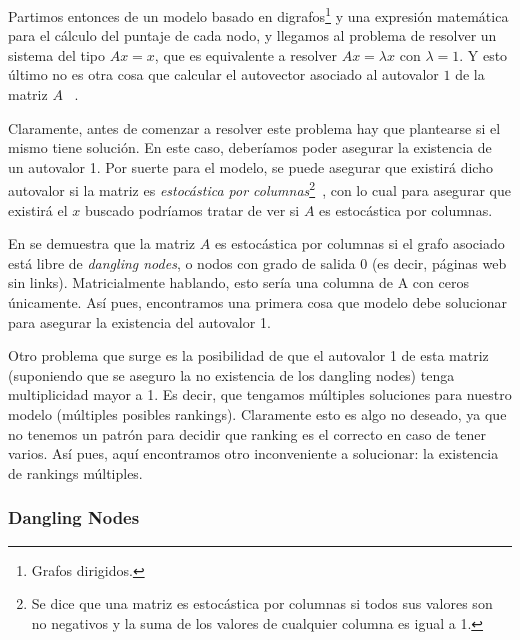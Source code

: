 \par Partimos entonces de un modelo basado en digrafos\footnote{Grafos
dirigidos.} y una expresi\'on matem\'atica para el c\'alculo del puntaje de cada
nodo, y llegamos al problema de resolver un sistema del tipo $Ax = x$, que es
equivalente a resolver $Ax = \lambda x$ con $\lambda = 1$. Y esto \'ultimo no es
otra cosa que calcular el autovector asociado al autovalor $1$ de la matriz $A$
~\cite[p.~443]{Burden2010}.

\par Claramente, antes de comenzar a resolver este problema hay que plantearse
si el mismo tiene soluci\'on. En este caso, deber\'iamos poder asegurar la
existencia de un autovalor 1. Por suerte para el modelo, se puede asegurar que
existir\'a dicho autovalor si la matriz es \emph{estoc\'astica por
columnas}\footnote{Se dice que una matriz es estoc\'astica por columnas si todos
sus valores son no negativos y la suma de los valores de cualquier columna es
igual a 1.}~\cite[p.572]{Bryan2006}, con lo cual para asegurar que existir\'a el
$x$ buscado podr\'iamos tratar de ver si $A$ es estoc\'astica por
columnas.

\par En \cite[p.572]{Bryan2006} se demuestra que la matriz $A$ es estoc\'astica
por columnas si el grafo asociado est\'a libre de \emph{dangling nodes}, o
nodos con grado de salida 0 (es decir, p\'aginas web sin links). Matricialmente
hablando, esto ser\'ia una columna de A con ceros \'unicamente. As\'i pues,
encontramos una primera cosa que modelo debe solucionar para asegurar la
existencia del autovalor 1.

\par Otro problema que surge es la posibilidad de que el autovalor 1 de esta
matriz (suponiendo que se aseguro la no existencia de los dangling nodes) tenga
multiplicidad mayor a 1. Es decir, que tengamos m\'ultiples soluciones para
nuestro modelo (m\'ultiples posibles rankings). Claramente esto es algo no
deseado, ya que no tenemos un patr\'on para decidir que ranking es el correcto
en caso de tener varios. As\'i pues, aqu\'i encontramos otro inconveniente a
solucionar: la existencia de rankings m\'ultiples.


\subsubsection{Dangling Nodes}

